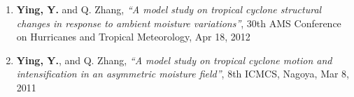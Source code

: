 \begin{enumerate}
\item \textbf{Ying, Y.} and Q. Zhang,
\textit{``A model study on tropical cyclone structural changes in response to ambient moisture variations''},
30th AMS Conference on Hurricanes and Tropical Meteorology, Apr 18, 2012

\item \textbf{Ying, Y.}, and Q. Zhang,
\textit{``A model study on tropical cyclone motion and intensification in an asymmetric moisture field''},
8th ICMCS, Nagoya, Mar 8, 2011

\end{enumerate}
